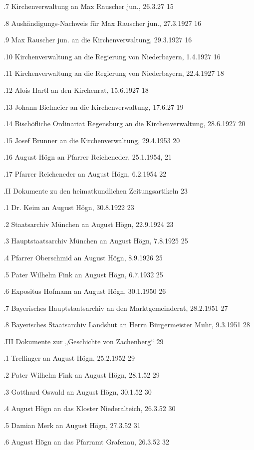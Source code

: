 \documentclass[12pt,a4paper]{book}
\begin{document}
.7 Kirchenverwaltung an Max Rauscher jun., 26.3.27  15

.8 Aushändigungs-Nachweis für Max Rauscher jun., 27.3.1927  16

.9 Max Rauscher jun. an die Kirchenverwaltung, 29.3.1927    16

.10 Kirchenverwaltung an die Regierung von Niederbayern, 1.4.1927   16

.11 Kirchenverwaltung an die Regierung von Niederbayern, 22.4.1927  18

.12 Alois Hartl an den Kirchenrat, 15.6.1927    18

.13 Johann Bielmeier an die Kirchenverwaltung, 17.6.27  19

.14 Bischöfliche Ordinariat Regensburg an die Kirchenverwaltung, 28.6.1927  20

.15 Josef Brunner an die Kirchenverwaltung, 29.4.1953   20

.16 August Högn an Pfarrer Reicheneder, 25.1.1954,  21

.17 Pfarrer Reicheneder an August Högn, 6.2.1954    22

.II Dokumente zu den heimatkundlichen Zeitungsartikeln  23

.1 Dr. Keim an August Högn, 30.8.1922   23

.2 Staatsarchiv München an August Högn, 22.9.1924   23

.3 Hauptstaatsarchiv München an August Högn, 7.8.1925   25

.4 Pfarrer Oberschmid an August Högn, 8.9.1926  25

.5 Pater Wilhelm Fink an August Högn, 6.7.1932  25

.6 Expositus Hofmann an August Högn, 30.1.1950  26

.7 Bayerisches Hauptstaatsarchiv an den Marktgemeinderat, 28.2.1951     27

.8 Bayerisches Staatsarchiv Landshut an Herrn Bürgermeister Muhr, 9.3.1951  28

.III Dokumente zur „Geschichte von Zachenberg“  29

.1 Trellinger an August Högn, 25.2.1952 29

.2 Pater Wilhelm Fink an August Högn, 28.1.52   29

.3 Gotthard Oswald an August Högn, 30.1.52  30

.4 August Högn an das Kloster Niederalteich, 26.3.52    30

.5 Damian Merk an August Högn, 27.3.52  31

.6 August Högn an das Pfarramt Grafenau, 26.3.52    32
\end{document}
